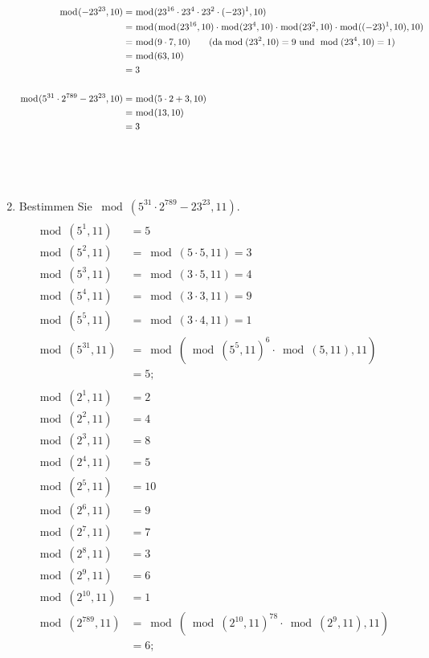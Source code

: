 \begin{enumerate}[label=(\alph*)]
\begin{align*}
			\bmod(-23^{23},10) &= \bmod(23^{16}\cdot23^{4}\cdot23^{2}\cdot(-23)^1,10) 
			\\&= \bmod(\bmod(23^{16},10)\cdot\bmod(23^{4},10)\cdot\bmod(23^{2},10)\cdot\bmod((-23)^1,10),10)
			\\&= \bmod(9\cdot 7, 10) \textrm{\qquad (da} \bmod(23^2,10)=9 \textrm{ und }\bmod(23^4,10)=1)
			\\&= \bmod(63,10) 
			\\&= 3 \\\\
			\bmod(5^{31} \cdot 2^{789}-23^{23}, 10) &= \bmod(5 \cdot 2 + 3,10)	
			\\&= \bmod(13,10) 
			\\&= 3
		\end{align*}
\\
\\
\\
		\item  Bestimmen Sie $ \bmod(5^{31} \cdot 2^{789}-23^{23}, 11) $. \
		\begin{align*}
			\\ \bmod(5^{1},11) &= 5
			\\ \bmod(5^{2},11) &= \bmod(5 \cdot 5, 11) = 3
			\\ \bmod(5^{3},11) &= \bmod(3 \cdot 5, 11) = 4
			\\ \bmod(5^{4},11) &= \bmod(3 \cdot 3, 11) = 9
			\\ \bmod(5^{5},11) &= \bmod(3 \cdot 4, 11) = 1
			\\ \bmod(5^{31},11) &= \bmod(\bmod(5^5,11)^6 \cdot \bmod(5,11), 11)  \\
			&=5;
			\\\\
			\bmod(2^1,11) &= 2 \\
			\bmod(2^2,11) &= 4 \\
			\bmod(2^3,11) &= 8 \\
			\bmod(2^4,11) &= 5 \\
			\bmod(2^5,11) &= 10 \\
			\bmod(2^6,11) &= 9 \\
			\bmod(2^7,11) &= 7 \\
			\bmod(2^8,11) &= 3 \\
			\bmod(2^9,11) &= 6 \\
			\bmod(2^{10},11) &= 1 \\
			\bmod(2^{789},11) &= \bmod(\bmod(2^{10},11)^{78} \cdot \bmod(2^9,11),11) \\
			&= 6;

\end{align*}
\end{enumerate}
